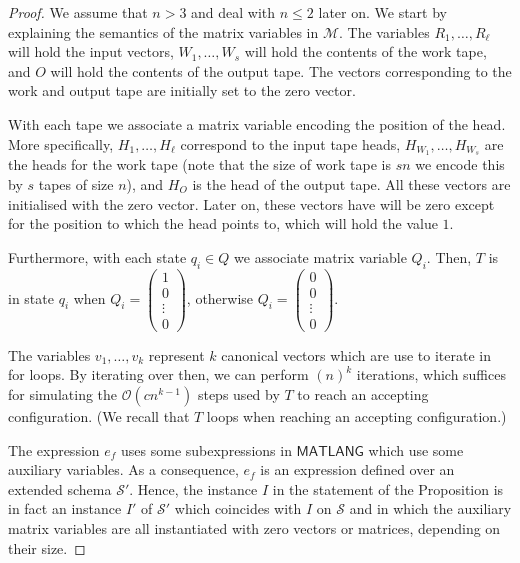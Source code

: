 \begin{proof}
	We assume that $n> 3$ and deal with $n\leq 2$ later on.
We start by explaining the semantics of the matrix variables in $\mathcal{M}$. The variables $R_1,\ldots,R_\ell$ will hold the input vectors, $W_1,\ldots,W_s$ will hold the contents of the work
tape, and $O$ will hold the contents of the output tape. The vectors corresponding to the work and output tape are initially set to the zero vector.

 With each tape we associate a matrix variable encoding the position of the head. More specifically, $H_1,\ldots,H_\ell$ correspond to the input tape heads,
$H_{W_1},\ldots, H_{W_s}$ are the heads for the work tape (note that the size of work tape is $sn$ we encode this by $s$ tapes of size $n$), and $H_O$ is the head of the output tape. All these vectors are initialised with the zero vector. Later on, these vectors have will be zero except for the position to which the head points to, which will hold the value $1$.

%
Furthermore, with each state $q_i\in Q$ we associate matrix variable $Q_i$.
Then, $T$ is in state $q_i$ when
 $Q_i=\left(\begin{smallmatrix}1\\
0\\\vdots\\0\end{smallmatrix}\right)$, otherwise $Q_i=\left(\begin{smallmatrix}0\\
0\\\vdots\\0\end{smallmatrix}\right)$.	

The variables $v_1,\ldots,v_{k}$ represent $k$ canonical vectors  which are use to iterate in for loops. By iterating over then, we can perform $(n)^{k}$ iterations, which suffices for simulating the $\mathcal{O}(cn^{k-1})$ steps used by $T$ to reach an accepting configuration. (We recall that $T$ loops when reaching an accepting configuration.)

The expression $e_f$ uses some subexpressions in $\mathsf{MATLANG}$ which use some auxiliary variables.
As a consequence, $e_f$ is an expression defined over an extended schema $\mathcal{S}'$. Hence, the instance $I$ in the statement of the Proposition is in fact an instance $I'$ of $\mathcal{S}'$ which
coincides with $I$ on $\mathcal{S}$ and in which the auxiliary matrix variables are all instantiated with zero vectors or matrices, depending on their size.


\end{proof}
